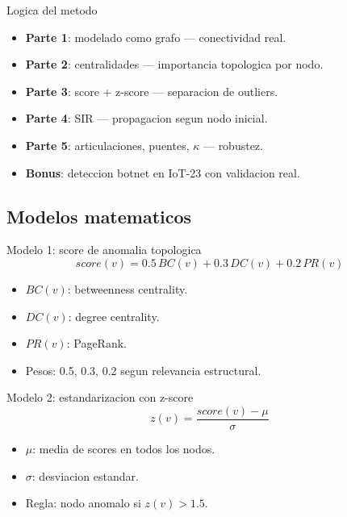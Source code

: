 \begin{frame}{Logica del metodo}
\protect{}\label{logica-del-metodo}
\begin{itemize}
\tightlist
\item
  \textbf{Parte 1}: modelado como grafo --- conectividad real.
\item
  \textbf{Parte 2}: centralidades --- importancia topologica por nodo.
\item
  \textbf{Parte 3}: score + z-score --- separacion de outliers.
\item
  \textbf{Parte 4}: SIR --- propagacion segun nodo inicial.
\item
  \textbf{Parte 5}: articulaciones, puentes, \(\kappa\) --- robustez.
\item
  \textbf{Bonus}: deteccion botnet en IoT-23 con validacion real.
\end{itemize}
\end{frame}

\subsection{Modelos matematicos}\label{modelos-matematicos}

\begin{frame}{Modelo 1: score de anomalia topologica}
\protect{}\label{modelo-1-score-de-anomalia-topologica}
\[
score(v)=0.5\,BC(v)+0.3\,DC(v)+0.2\,PR(v)
\]

\begin{itemize}
\tightlist
\item
  \(BC(v)\): betweenness centrality.
\item
  \(DC(v)\): degree centrality.
\item
  \(PR(v)\): PageRank.
\item
  Pesos: 0.5, 0.3, 0.2 segun relevancia estructural.
\end{itemize}
\end{frame}

\begin{frame}{Modelo 2: estandarizacion con z-score}
\protect{}\label{modelo-2-estandarizacion-con-z-score}
\[
z(v)=\frac{score(v)-\mu}{\sigma}
\]

\begin{itemize}
\tightlist
\item
  \(\mu\): media de scores en todos los nodos.
\item
  \(\sigma\): desviacion estandar.
\item
  Regla: nodo anomalo si \(z(v)>1.5\).
\end{itemize}
\end{frame}

